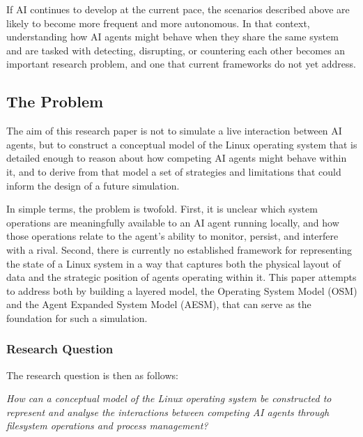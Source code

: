 If AI continues to develop at the current pace, the scenarios described above are likely to become more frequent and more autonomous. In that context, understanding how AI agents might behave when they share the same system and are tasked with detecting, disrupting, or countering each other becomes an important research problem, and one that current frameworks do not yet address. 

\subsection{The Problem}
\label{TheProblem}

The aim of this research paper is not to simulate a live interaction between AI agents, but to construct a conceptual model of the Linux operating system that is detailed enough to reason about how competing AI agents might behave within it, and to derive from that model a set of strategies and limitations that could inform the design of a future simulation.

In simple terms, the problem is twofold. First, it is unclear which system operations are meaningfully available to an AI agent running locally, and how those operations relate to the agent's ability to monitor, persist, and interfere with a rival. Second, there is currently no established framework for representing the state of a Linux system in a way that captures both the physical layout of data and the strategic position of agents operating within it. This paper attempts to address both by building a layered model, the Operating System Model (OSM) and the Agent Expanded System Model (AESM), that can serve as the foundation for such a simulation.

\subsubsection{Research Question}
\label{ResearchQuestion}

The research question is then as follows:

\begin{center}
    \textit{How can a conceptual model of the Linux operating system be constructed to represent and analyse the interactions between competing AI agents through filesystem operations and process management?}
\end{center}

